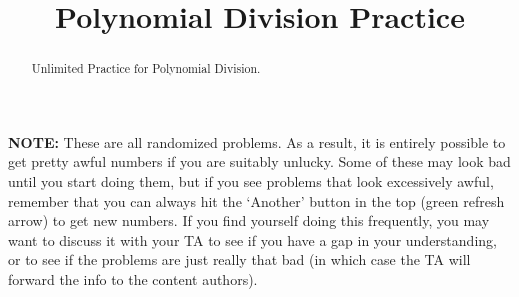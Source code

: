 \documentclass{ximeraXloud}
\title{Polynomial Division Practice}
\begin{document}
\begin{abstract}
    Unlimited Practice for Polynomial Division.
\end{abstract}%
\maketitle

\textbf{NOTE:} These are all randomized problems. As a result, it is entirely possible to get pretty awful numbers if you are suitably unlucky. Some of these may look bad until you start doing them, but if you see problems that look excessively awful, remember that you can always hit the `Another' button in the top (green refresh arrow) to get new numbers. If you find yourself doing this frequently, you may want to discuss it with your TA to see if you have a gap in your understanding, or to see if the problems are just really that bad (in which case the TA will forward the info to the content authors).
\end{document}
